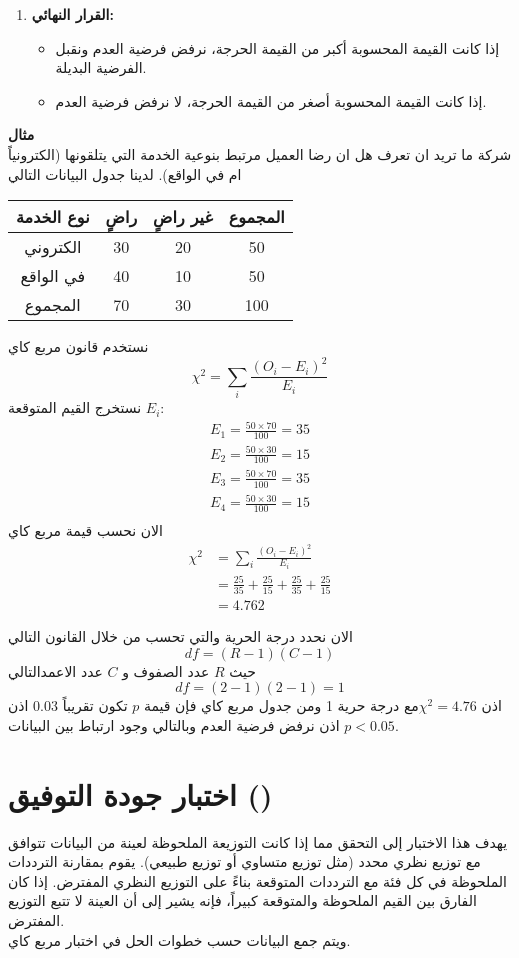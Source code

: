 \begin{enumerate}
	\item \textbf{القرار النهائي:}
	\begin{itemize}
		\item إذا كانت القيمة المحسوبة أكبر من القيمة الحرجة، نرفض فرضية العدم ونقبل الفرضية البديلة.
		\item إذا كانت القيمة المحسوبة أصغر من القيمة الحرجة، لا نرفض فرضية العدم.
	\end{itemize}
\end{enumerate}


\noindent
\textbf{مثال}\\
شركة ما تريد ان تعرف هل ان رضا العميل مرتبط بنوعية الخدمة التي يتلقونها (الكترونياً ام في الواقع). لدينا جدول البيانات التالي

\begin{table}[H]
    \centering
	\begin{tabular}{| c| c| c| c|}
		\hline
		نوع الخدمة & راضٍ & غير راضٍ & المجموع \\
		\hline 
		الكتروني & 30 & 20 & 50 \\
		\hline
		في الواقع & 40 & 10 & 50 \\
		\hline
		المجموع & 70 & 30 &100\\
		\hline
	\end{tabular}
\end{table}
نستخدم قانون مربع كاي
\[
\chi^2 = \sum_i \frac{(O_i - E_i)^2}{E_i} 
\]
نستخرج القيم المتوقعة $E_i$:
\begin{align*}
	E_1 = \frac{50\times 70}{100} = 35\\
	E_2 = \frac{50\times30}{100} = 15\\
	E_3 = \frac{50\times70}{100} = 35\\
	E_4 = \frac{50\times30}{100} = 15\\
\end{align*}
الان نحسب قيمة مربع كاي
\begin{align*}
	\chi^2 &= \sum_i \frac{(O_i - E_i)^2}{E_i} \\
	&= \frac{25}{35} + \frac{25}{15} + \frac{25}{35} + \frac{25}{15}\\
	&= 4.762
\end{align*}

الان نحدد درجة الحرية والتي تحسب من خلال القانون التالي
\[
df = (R-1)(C-1)
\]
حيث $R$ عدد الصفوف و $C$ عدد الاعمدالتالي
\[
df = (2-1)(2-1) = 1
\]
اذن $\chi^2 = 4.76$مع درجة حرية 1 ومن جدول مربع كاي فإن قيمة $p$ تكون تقريباً $0.03$ اذن $p < 0.05$ اذن نرفض فرضية العدم وبالتالي وجود ارتباط بين البيانات.
\section{اختبار جودة التوفيق ()}
يهدف هذا الاختبار إلى التحقق مما إذا كانت التوزيعة الملحوظة لعينة من البيانات تتوافق مع توزيع نظري محدد (مثل توزيع متساوي أو توزيع طبيعي). يقوم بمقارنة الترددات الملحوظة في كل فئة مع الترددات المتوقعة بناءً على التوزيع النظري المفترض. إذا كان الفارق بين القيم الملحوظة والمتوقعة كبيراً، فإنه يشير إلى أن العينة لا تتبع التوزيع المفترض.\\
ويتم جمع البيانات حسب خطوات الحل في اختبار مربع كاي.

